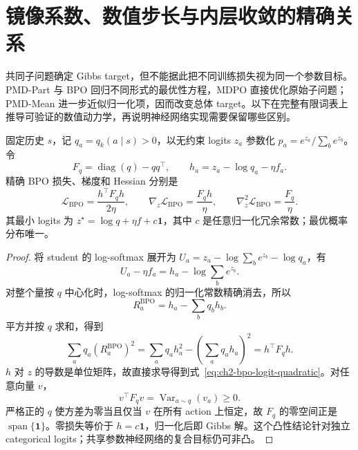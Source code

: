 \section{镜像系数、数值步长与内层收敛的精确关系}
\label{sec:ch2-eta-step-audit}

共同子问题确定 Gibbs target，但不能据此把不同训练损失视为同一个参数目标。PMD-Part 与 BPO 回归不同形式的最优性方程，MDPO 直接优化原始子问题；PMD-Mean 进一步近似归一化项，因而改变总体 target。以下在完整有限词表上推导可验证的数值动力学，再说明神经网络实现需要保留哪些区别。

\begin{proposition}
\label{prop:ch2-bpo-logit-quadratic}
固定历史 $s$，记 $q_a= q_k(a\mid s)>0$，以无约束 logits $z_a$ 参数化 $p_a=e^{z_a}/\sum_b e^{z_b}$。令
\begin{equation*}
 F_q=\operatorname{diag}(q)-qq^\top,\qquad
 h_a=z_a-\log q_a-\eta f_a.
\end{equation*}
精确 BPO 损失、梯度和 Hessian 分别是
\begin{equation}
 \mathcal L_{\mathrm{BPO}}=\frac{h^\top F_qh}{2\eta},\qquad
 \nabla_z\mathcal L_{\mathrm{BPO}}=\frac{F_qh}{\eta},\qquad
 \nabla_z^2\mathcal L_{\mathrm{BPO}}=\frac{F_q}{\eta}.
 \label{eq:ch2-bpo-logit-quadratic}
\end{equation}
其最小 logits 为 $z^\star=\log q+\eta f+c\mathbf1$，其中 $c$ 是任意归一化冗余常数；最优概率分布唯一。
\end{proposition}

\begin{proof}
将 student 的 log-softmax 展开为 $U_a=z_a-\log\sum_b e^{z_b}-\log q_a$，有
\begin{equation*}
 U_a-\eta f_a=h_a-\log\sum_b e^{z_b}.
\end{equation*}
对整个量按 $q$ 中心化时，log-softmax 的归一化常数精确消去，所以
\begin{equation*}
 R_a^{\mathrm{BPO}}=h_a-\sum_bq_bh_b.
\end{equation*}
平方并按 $q$ 求和，得到
\begin{equation*}
 \sum_aq_a(R_a^{\mathrm{BPO}})^2
 =\sum_aq_ah_a^2-\left(\sum_aq_ah_a\right)^2=h^\top F_qh.
\end{equation*}
$h$ 对 $z$ 的导数是单位矩阵，故直接求导得到式~\eqref{eq:ch2-bpo-logit-quadratic}。对任意向量 $v$，
\begin{equation*}
 v^\top F_qv=\operatorname{Var}_{a\sim q}(v_a)\ge0.
\end{equation*}
严格正的 $q$ 使方差为零当且仅当 $v$ 在所有 action 上恒定，故 $F_q$ 的零空间正是 $\operatorname{span}\{\mathbf1\}$。零损失等价于 $h=c\mathbf1$，归一化后即 Gibbs 解。这个凸性结论针对独立 categorical logits；共享参数神经网络的复合目标仍可非凸。
\end{proof}

